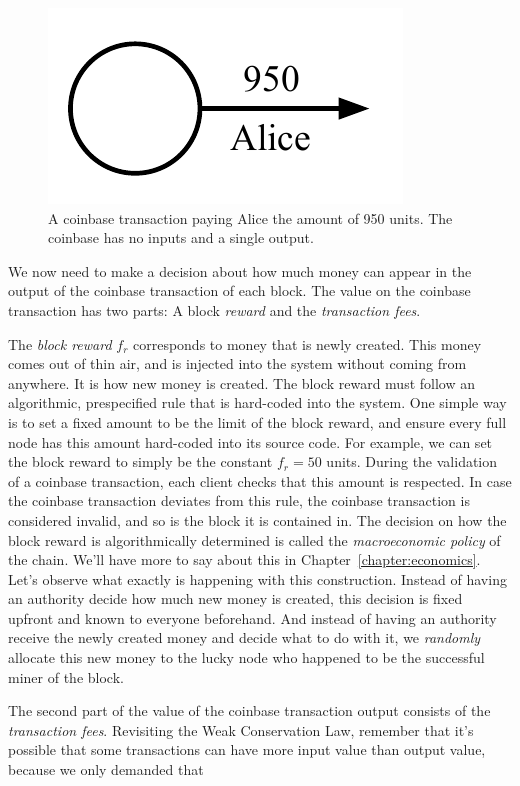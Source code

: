 \begin{figure}[h]
    \centering
    \includegraphics[width=0.23 \columnwidth,keepaspectratio]{figures/coinbase.pdf}
    \caption{A coinbase transaction paying Alice the amount of 950 units. The coinbase has no inputs and a single output.}
    \label{fig.coinbase}
\end{figure}

We now need to make a decision about how much money can appear in the output of the coinbase
transaction of each block. The value on the coinbase transaction has two parts: A block \emph{reward}
and the \emph{transaction fees}.

The \emph{block reward} $f_r$ corresponds
to money that is newly created. This money comes out of thin air, and is injected into the system
without coming from anywhere. It is how new money is created. The block reward must follow an
algorithmic, prespecified rule that is hard-coded into the system. One simple way is to set a fixed
amount to be the limit of the block reward, and ensure every full node has this amount hard-coded
into its source code. For example, we can set the block reward to simply be the constant $f_r = 50$ units.
During the validation of a coinbase transaction, each client checks that this
amount is respected. In case the coinbase transaction deviates from this rule, the coinbase transaction
is considered invalid, and so is the block it is contained in. The decision on how the block reward
is algorithmically determined is called the \emph{macroeconomic policy} of the chain. We'll have
more to say about this in Chapter~\ref{chapter:economics}. Let's observe what exactly is happening
with this construction. Instead of having an authority decide how much new money is created, this
decision is fixed upfront and known to everyone beforehand. And instead of having an authority
receive the newly created money and decide what to do with it, we \emph{randomly} allocate this
new money to the lucky node who happened to be the successful miner of the block.

The second part of the value of the coinbase transaction output consists of the \emph{transaction fees}.
Revisiting the Weak Conservation Law, remember that it's possible that some transactions can have
more input value than output value, because we only demanded that


